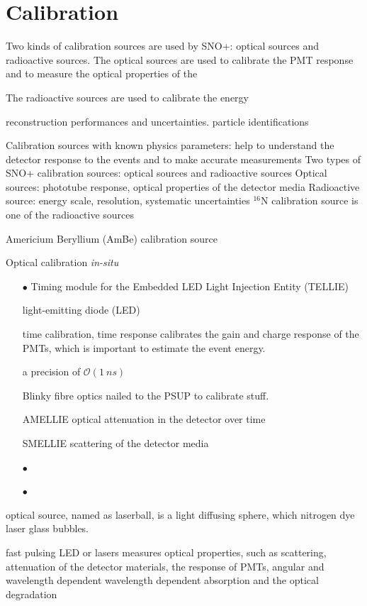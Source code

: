\section{Calibration}
Two kinds of calibration sources are used by SNO+: optical sources and radioactive sources. 
The optical sources are used to calibrate the PMT response and to measure the optical properties of the 

The radioactive sources are used to calibrate the energy 

reconstruction performances and uncertainties.
particle identifications

Calibration sources with known physics parameters: help to understand the detector response to the events and to make accurate measurements
Two types of SNO+ calibration sources: optical sources and radioactive sources Optical sources: phototube response, optical properties of the detector media Radioactive source: energy scale, resolution, systematic
uncertainties
$^{16}$N calibration source is one of the radioactive sources


Americium Beryllium (AmBe) calibration source

Optical calibration  {\emph {in-situ}} 
\begin{itemize}  
	\item[$\bullet$] Timing module for the Embedded LED Light Injection Entity (TELLIE)
	
	light-emitting diode (LED)
	
	
	time calibration, time response
	calibrates the gain and charge response of the PMTs, which is important to estimate the event energy.
	
	a precision of $\mathcal{O} (1~ns)$
	
	Blinky fibre optics nailed to the PSUP to calibrate stuff.
	
	AMELLIE
	optical attenuation in the detector over time
	
	SMELLIE scattering of the detector media
	
	\item[$\bullet$]  
	
	
	\item[$\bullet$] 
\end{itemize}

optical source, named as laserball, is a light diffusing sphere, which nitrogen dye laser glass bubbles.



fast pulsing LED or lasers
measures optical properties, such as scattering, attenuation of the detector materials, the response of PMTs, 
angular and wavelength dependent
wavelength dependent absorption and the optical degradation




